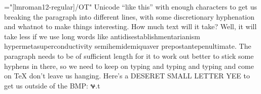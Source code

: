 \font\x="[lmroman12-regular]/OT"
\x Unicode “like this” with enough characters to get us breaking the paragraph
into different lines, with some discretionary hyphenation and whatnot to make
things interesting. How much text will it take? Well, it will take less if we
use long words like antidisestablishmentarianism hypermetasuperconductivity
semihemidemiquaver prepostantepenultimate. The paragraph needs to be of
sufficient length for it to work out better to stick some hyphens in there, so
we need to keep on typing and typing and typing and come on TeX don't leave us
hanging. Here's a DESERET SMALL LETTER YEE to get us outside of the BMP: 𐐷.t
\bye
